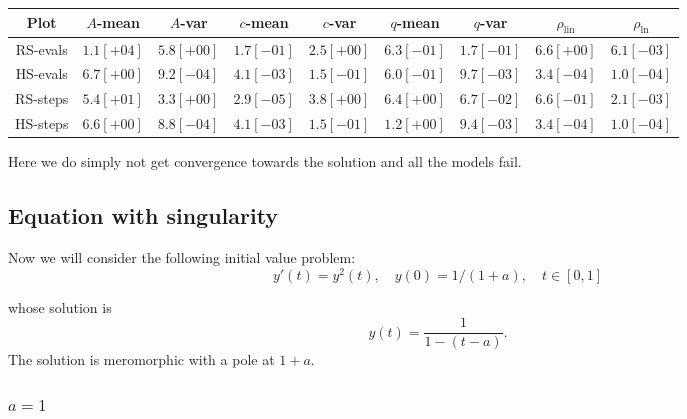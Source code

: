 \begin{table}[H]
    \centering
    \small
     \begin{tabular}{c||c|c|c|c|c|c|c|c}
Plot & \(A\)-mean & \(A\)-var & \(c\)-mean & \(c\)-var & \(q\)-mean & \(q\)-var & \(\rho_{\operatorname{lin}}\) & \(\rho_{\ln}\)\\\hline
\rowcolor{red}
RS-evals & \(1.1[+04]\) & \(5.8[+00]\) & \(1.7[-01]\) & \(2.5[+00]\) & \(6.3[-01]\) & \(1.7[-01]\) & \(6.6[+00]\) & \(6.1[-03]\) \\
\rowcolor{red}
HS-evals & \(6.7[+00]\) & \(9.2[-04]\) & \(4.1[-03]\) & \(1.5[-01]\) & \(6.0[-01]\) & \(9.7[-03]\) & \(3.4[-04]\) & \(1.0[-04]\) \\
\rowcolor{red}
RS-steps & \(5.4[+01]\) & \(3.3[+00]\) & \(2.9[-05]\) & \(3.8[+00]\) & \(6.4[+00]\) & \(6.7[-02]\) & \(6.6[-01]\) & \(2.1[-03]\) \\
\rowcolor{red}
HS-steps & \(6.6[+00]\) & \(8.8[-04]\) & \(4.1[-03]\) & \(1.5[-01]\) & \(1.2[+00]\) & \(9.4[-03]\) & \(3.4[-04]\) & \(1.0[-04]\) \\
    \end{tabular}
    \label{tab:my_label}
\end{table}

Here we do simply not get convergence towards the solution and all the models fail.

\subsection{Equation with singularity}

Now we will consider the following initial value problem:
\begin{equation}\label{46}
y'(t) = y^2(t),\quad y(0) = 1/(1+a), \quad t\in [0,1]
\end{equation}

whose solution is 
\[
y(t) = \frac{1}{1-(t-a)}.
\]
The solution is meromorphic with a pole at \(1+a\).

\subsubsection{\(a = 1\)}

